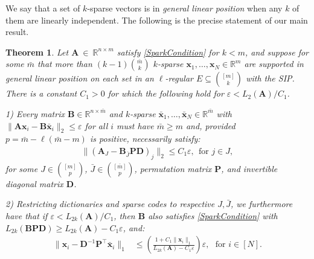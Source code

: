 \documentclass[9pt,twocolumn]{pnas-new}
\newtheorem{theorem}{Theorem}
\begin{document}
We say that a set of $k$-sparse vectors is in \emph{general linear position} when any $k$ of them are linearly independent.
The following is the precise statement of our main result. 

\begin{theorem}\label{DeterministicUniquenessTheorem}
Let $\mathbf{A}~\in~\mathbb{R}^{n \times m}$ satisfy \eqref{SparkCondition} for $k < m$, and suppose for some $\bar m$ that more than \mbox{$(k-1){\bar m \choose k}$} $k$-sparse \mbox{$\mathbf{x}_1, \ldots, \mathbf{x}_N \in \mathbb{R}^m$} are supported in general linear position on each set in an $\ell$-regular $E \subseteq {[m] \choose k}$ with the SIP.  There is a constant $C_1 > 0$ for which the following hold for $\varepsilon < L_2(\mathbf{A}) / C_1$.

1) Every matrix $\mathbf{B} \in \mathbb{R}^{n \times \bar m}$ and $k$-sparse $\mathbf{\bar x}_1, \ldots, \mathbf{\bar x}_N \in \mathbb{R}^{\bar m}$ with  \mbox{$\|\mathbf{A}\mathbf{x}_i - \mathbf{B}\mathbf{\bar x}_i\|_2 \leq \varepsilon$} for all $i$ must have $\bar m \geq m$ and, provided $p = \bar m - \ell(\bar m - m)$ is positive, necessarily satisfy:
\begin{align}\label{Cstable}
\|(\mathbf{A}_J- \mathbf{B}_{\bar J} \mathbf{PD} )_j\|_2 \leq C_1 \varepsilon, \ \  \text{for $j \in J$},
\end{align}
for some $J \in {[m] \choose p}$, $\bar J \in {[\bar m] \choose p}$, permutation matrix $\mathbf{P}$, and invertible diagonal matrix $\mathbf{D}$.

2) Restricting dictionaries and sparse codes to respective $J, \bar{J}$, we furthermore have that if $\varepsilon < L_{2k}(\mathbf{A}) / C_1$, then $\mathbf{B}$ also satisfies \eqref{SparkCondition} with $L_{2k}(\mathbf{B}\mathbf{PD}) \geq L_{2k}(\mathbf{A}) - C_1 \varepsilon$, and:
\begin{align}\label{b-PDa}
\|\mathbf{x}_i - \mathbf{D}^{-1}\mathbf{P}^{\top}\mathbf{\bar x}_i\|_1 &\leq  \left( \frac{ 1+C_1 \|\mathbf{x}_i\|_1 }{ L_{2k}(\mathbf{A}) -  C_1\varepsilon } \right) \varepsilon,\ \ \   \text{for $i \in [N]$}.
\end{align}
\end{theorem}

\end{document}
